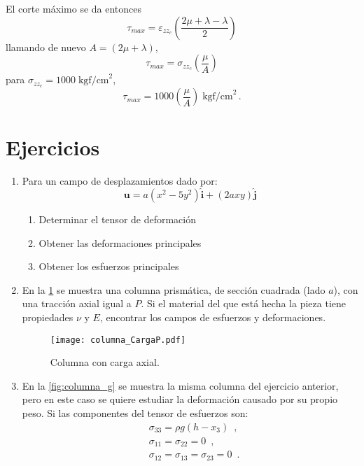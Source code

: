 \documentclass[../notas medios.tex]{subfiles}
\begin{document}
\begin{itemize}
El corte máximo se da entonces
\[\tau_{max} = \varepsilon _{zz_c}  \left(\dfrac{2\mu + \lambda - \lambda}{2}\right)\]
llamando de nuevo $A = (2 \mu + \lambda)$,
\[\tau_{max} = \sigma_{zz_c} \left(\dfrac{\mu}{A}\right)\]
para  $\sigma_{zz_c} = 1000 \; \text{kgf/cm}^2$,
\[\tau_{max} = 1000 \left(\dfrac{\mu}{A}\right) \; \text{kgf/cm}^2\, .\] 

\end{itemize}


\section{Ejercicios}


\begin{enumerate}

\item \label{punto01_m} Para un campo de desplazamientos dado por:
\[\mathbf{u} = a(x^2 - 5y^2)\hat{\mathbf{i}} + (2ax y)\hat{\mathbf{j}} \]

\begin{enumerate}
\item Determinar el tensor de deformación
\item Obtener las deformaciones principales
\item Obtener los esfuerzos principales
\end{enumerate}

\item \label{punto02_m}  En la  \cref{columna_CargaP} se muestra una columna prismática, de sección cuadrada (lado $a$), con una tracción axial igual a $P$. Si el material del que está hecha la pieza tiene propiedades $\nu$ y $E$, encontrar los campos de esfuerzos y deformaciones.
\begin{figure}[H]
	\centering
	\texttt{[image: columna\_CargaP.pdf]} 
	\caption{Columna con carga axial.}
	\label{columna_CargaP}
\end{figure}

\item \label{punto03_m} En la \cref{fig:columna_g} se muestra la misma columna  del ejercicio anterior, pero en este caso se quiere estudiar la deformación causado por su propio peso. Si las componentes del tensor de esfuerzos son:
\begin{align*}
&\sigma_{33} = \rho g(h- x_{3}) \enspace ,\\
&\sigma_{11} = \sigma_{22} = 0 \enspace ,\\
&\sigma_{12} = \sigma_{13} = \sigma_{23} = 0 \enspace .
\end{align*}


\end{enumerate}
\end{document}
